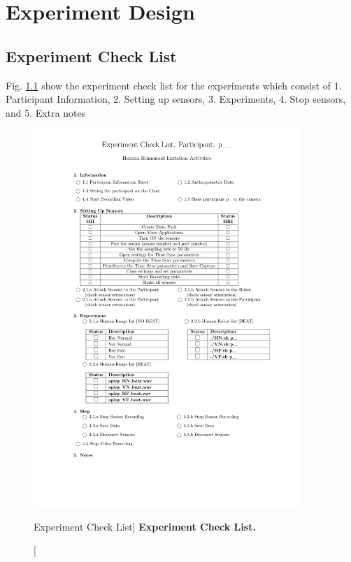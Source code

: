 \chapter{Experiment Design} \label{appendix:c}

\graphicspath{
	{appendixC/experiment_check_list/PDF/}
	{appendixC/participation_sheet/}}



\section{Experiment Check List} \label{appendix:c:ecl}
Fig. \ref{fig:ecl} show the experiment check list for the experiments 
which consist of  1. Participant Information, 2. Setting up sensors, 
3. Experiments, 4. Stop sensors, and 5. Extra notes
\begin{figure}
 \centering
   \includegraphics[width=0.9\textwidth]{cl}
   \caption
	[Experiment Check List]{
	{\bf Experiment Check List.}
}
   \label{fig:ecl}
\end{figure}

